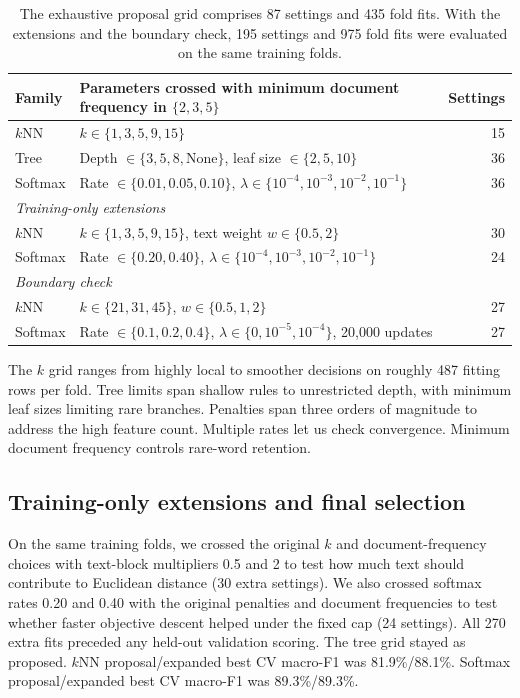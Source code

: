 \documentclass[12pt]{article}
\newcommand{\knn}{$k$NN}
\begin{document}
\begin{table}[h]
\centering
\small
\begin{tabular}{llr}
\toprule
Family & Parameters crossed with minimum document frequency in $\{2,3,5\}$ & Settings \\
\midrule
\knn    & $k\in\{1,3,5,9,15\}$ & 15 \\
Tree    & Depth $\in\{3,5,8,\text{None}\}$, leaf size $\in\{2,5,10\}$ & 36 \\
Softmax & Rate $\in\{0.01,0.05,0.10\}$, $\lambda\in\{10^{-4},10^{-3},10^{-2},10^{-1}\}$ & 36 \\
\midrule
\multicolumn{3}{l}{\emph{Training-only extensions}} \\
\knn    & $k\in\{1,3,5,9,15\}$, text weight $w\in\{0.5,2\}$ & 30 \\
Softmax & Rate $\in\{0.20,0.40\}$, $\lambda\in\{10^{-4},10^{-3},10^{-2},10^{-1}\}$ & 24 \\
\midrule
\multicolumn{3}{l}{\emph{Boundary check}} \\
\knn    & $k\in\{21,31,45\}$, $w\in\{0.5,1,2\}$ & 27 \\
Softmax & Rate $\in\{0.1,0.2,0.4\}$, $\lambda\in\{0,10^{-5},10^{-4}\}$, 20{,}000 updates & 27 \\
\bottomrule
\end{tabular}
\caption{The exhaustive proposal grid comprises 87 settings and 435 fold fits.
With the extensions and the boundary check, 195 settings and 975 fold fits
were evaluated on the same training folds.}
\label{tab:grid}
\end{table}

The $k$ grid ranges from highly local to smoother decisions on roughly 487
fitting rows per fold. Tree limits span shallow rules to unrestricted depth,
with minimum leaf sizes limiting rare branches. Penalties span three orders of
magnitude to address the high feature count. Multiple rates let us check
convergence. Minimum document frequency controls rare-word retention.

\subsection*{Training-only extensions and final selection}

On the same training folds, we crossed the original $k$ and
document-frequency choices with text-block multipliers 0.5 and 2 to test how
much text should contribute to Euclidean distance (30 extra settings). We also
crossed softmax rates 0.20 and 0.40 with the original penalties and document
frequencies to test whether faster objective descent helped under the fixed cap
(24 settings). All 270 extra fits preceded any held-out validation scoring.
The tree grid stayed as proposed. \knn{} proposal/expanded best CV macro-F1
was 81.9\%/88.1\%. Softmax proposal/expanded best CV macro-F1 was
89.3\%/89.3\%.
\end{document}
